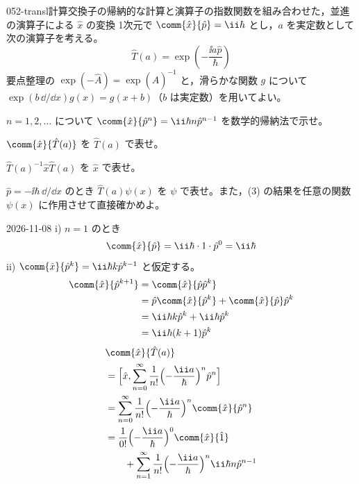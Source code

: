 \documentclass[uplatex,dvipdfmx,a4paper,11pt]{jsarticle}
\begin{document}
\begin{mondai}{052-transl}{計算}{交換子の帰納的な計算と演算子の指数関数を組み合わせた，並進の演算子による $\hat{x}$ の変換}
1次元で $\comm{\hat{x}}{\hat{p}}=\ii\hbar$ とし，$a$ を実定数として次の演算子を考える。
  \[ \hat{T}(a)=\exp\left(-\frac{\ii a\hat{p}}{\hbar}\right) \]
  要点整理の $\exp(-\hat{A})=\exp(\hat{A})^{-1}$ と，滑らかな関数 $g$ について $\exp(b\,\dd/\dd x)g(x)=g(x+b)$（$b$ は実定数）を用いてよい。
  \begin{shoumon}
    \item $n=1,2,\dots$ について $\comm{\hat{x}}{\hat{p}^{n}}=\ii\hbar n\hat{p}^{n-1}$ を数学的帰納法で示せ。
    \item $\comm{\hat{x}}{\hat{T}(a)}$ を $\hat{T}(a)$ で表せ。
    \item $\hat{T}(a)^{-1}\hat{x}\hat{T}(a)$ を $\hat{x}$ で表せ。
    \item $\hat{p}=-\ii\hbar\,\dd/\dd x$ のとき $\hat{T}(a)\psi(x)$ を $\psi$ で表せ。また，(3) の結果を任意の関数 $\psi(x)$ に作用させて直接確かめよ。
  \end{shoumon}
\begin{kotaeutsushi}{2026-11-08}
i) $n=1$ のとき
\[ \comm{\hat{x}}{\hat{p}}=\ii\hbar\cdot1\cdot\hat{p}^{0}=\ii\hbar \]
ii) $\comm{\hat{x}}{\hat{p}^{k}}=\ii\hbar k\hat{p}^{k-1}$ と仮定する。
\begin{align*}
\comm{\hat{x}}{\hat{p}^{k+1}}&=\comm{\hat{x}}{\hat{p}\hat{p}^{k}}\\
&=\hat{p}\comm{\hat{x}}{\hat{p}^{k}}+\comm{\hat{x}}{\hat{p}}\hat{p}^{k}\\
&=\ii\hbar k\hat{p}^{k}+\ii\hbar\hat{p}^{k}\\
&=\ii\hbar(k+1)\hat{p}^{k}
\end{align*}
\begin{align*}
&\comm{\hat{x}}{\hat{T}(a)}\\
&=\Bigl[\hat{x},\sum_{n=0}^{\infty}\frac{1}{n!}\Bigl(-\frac{\ii a}{\hbar}\Bigr)^{n}\hat{p}^{n}\Bigr]\\
&=\sum_{n=0}^{\infty}\frac{1}{n!}\Bigl(-\frac{\ii a}{\hbar}\Bigr)^{n}\comm{\hat{x}}{\hat{p}^{n}}\\
&=\frac{1}{0!}\Bigl(-\frac{\ii a}{\hbar}\Bigr)^{0}\comm{\hat{x}}{\hat{1}}\\
&\qquad+\sum_{n=1}^{\infty}\frac{1}{n!}\Bigl(-\frac{\ii a}{\hbar}\Bigr)^{n}\ii\hbar n\hat{p}^{n-1}\\

\end{align*}
\end{kotaeutsushi}
\end{mondai}
\end{document}
